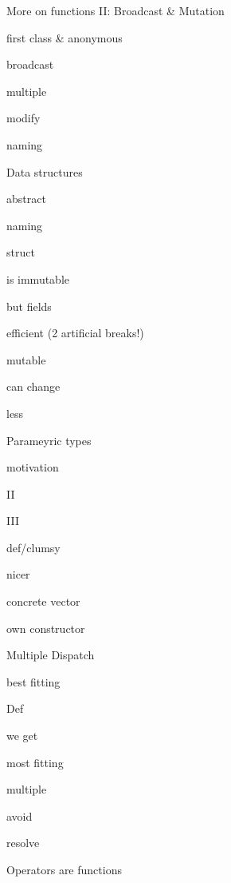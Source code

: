 \documentclass[a5paper,12pt,DIV=14,footheight=-30pt, headheight=60pt, twoside=off]{scrartcl}
\newenvironment{sublist}[1][]{%
  \color{juliapurple}%
  \quad\begin{enumerate*}[#1]%
}%
{\end{enumerate*}}
\begin{document}
\begin{enumerate}[resume]
\begin{sublist}
    \end{sublist}
    \item More on functions II: Broadcast \& Mutation
    \begin{sublist}
        \item first class \& anonymous \item broadcast \item multiple
        \item modify \item naming
    \end{sublist}
    \item Data structures
    \begin{sublist}
        \item abstract \item naming \item struct \item is immutable \item but fields
        \item efficient (2 artificial breaks!)
        \item mutable \item can change \item less
    \end{sublist}
    \item Parameyric types
    \begin{sublist}
        \item motivation \item II \item III \item def/clumsy \item nicer
        \item concrete vector \item own constructor
    \end{sublist}
    \item Multiple Dispatch
    \begin{sublist}
        \item best fitting \item Def \item we get \item most fitting
        \item multiple \item avoid \item resolve
    \end{sublist}
    \item Operators are functions
    \begin{sublist}

\end{sublist}
\end{enumerate}
\end{document}
